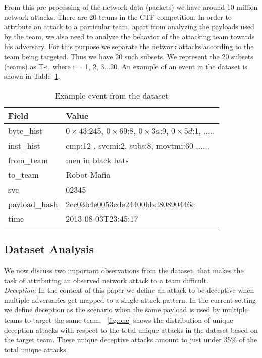 \documentclass[conference]{IEEEtran}
\begin{document}
From this pre-processing of the network data (packets) we have around 10 million network attacks. There are 20 teams in the CTF competition. In order to attribute an attack to a particular team, apart from analyzing the payloads used by the team, we also need to analyze the behavior of the attacking team towards his adversary. For this purpose we separate the network attacks according to the team being targeted. Thus we have 20 such subsets. We represent the 20 subsets (teams) as T-i, where i = 1, 2, 3...20. An example of an event in the dataset is shown in Table~\ref{event}.
\vspace{-1em}
\begin{table}[h!]
	\caption{\textmd{Example event from the dataset}}
	\label{event}
	\tiny
	\centering
	\renewcommand{\arraystretch}{1.5}
	
	\begin{tabular}{|p{2.3cm}|p{4cm}|} 
		\hline
		{\bf Field} &  {\bf Value} \\ \hline 
		
		\textsf{byte\_hist} & $0{\times}43$:245, $0{\times}69$:8, $0{\times}3a$:9, $0{\times}5d$:1, .....\\ \hline
		\textsf{inst\_hist} & cmp:12 , svcmi:2, subs:8, movtmi:60 ......\\ \hline
		\textsf{from\_team} &  men in black hats\\ \hline
		\textsf{to\_team} & Robot Mafia\\ \hline
		\textsf{svc} & 02345\\ \hline
		\textsf{payload\_hash} & 2cc03b4e0053cde24400bbd80890446c\\ \hline
		\textsf{time} & 2013-08-03T23:45:17\\
		\hline
	\end{tabular}
	\vspace{-1em}
	
\end{table}

\subsection{Dataset Analysis}
We now discuss two important observations from the dataset, that makes the task of attributing an observed network attack to a team difficult.\smallskip \\
\noindent\textit{Deception:}
In the context of this paper we define an attack to be deceptive when multiple adversaries get mapped to a single attack pattern. In the current setting we define deception as the scenario when the same payload is used by multiple teams to target the same team. \figurename~\ref{fig:one} shows the distribution of unique deception attacks with respect to the total unique attacks in the dataset based on the target team. These unique deceptive attacks amount to just under 35\% of the total unique attacks. 
\end{document}
